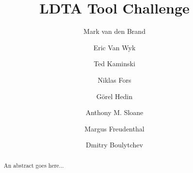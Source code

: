 \documentclass[english,preprint,12pt]{elsarticle}
\begin{document}
\begin{frontmatter}



\title{LDTA Tool Challenge}


\author[tue]{Mark van den Brand}


\author[umn]{Eric Van Wyk}
\author[umn]{Ted Kaminski}

\author[lu]{Niklas Fors}
\author[lu]{G{\"o}rel Hedin}

\author[mq]{Anthony M. Sloane}

\author[cy]{Margus Freudenthal}

\author[spbu]{Dmitry Boulytchev}

\address[tue]{Technical University of Eindhoven, Eindhoven, The Netherlands}
\address[umn]{University of Minnesota, Minneapolis, MN, United States}
\address[lu]{Lund University, Lund, Sweden}
\address[mq]{Macquarie University, Sydney, Australia}
\address[cy]{Cybernetica AS / University of Tartu, Tartu, Estonia}
\address[spbu]{St-Petersburg State University, St.Petersburg, Russia}

\begin{abstract}

An abstract goes here...

\end{abstract}

\begin{keyword}


\end{keyword}

\end{frontmatter}
\end{document}

